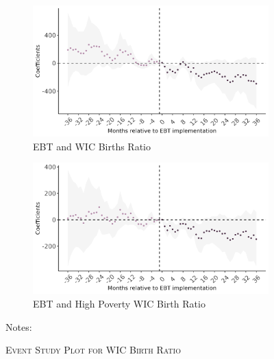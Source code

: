 \begin{figure}[!htbp]
	\begin{subfigure}[t]{.5\textwidth}
		\centering
		\includegraphics[width=\textwidth]{frac_mom_wic.png}  
		\caption{EBT and WIC Births Ratio}
		\label{mk_es1}
	\end{subfigure}
	\begin{subfigure}[t]{.5\textwidth}
		\centering
		\includegraphics[width=\textwidth]{frac_poor_wic.png}  
		\caption{EBT and High Poverty WIC Birth Ratio}
		\label{mk_es2}
	\end{subfigure}
	\caption{\textsc{Event Study Plot for WIC Birth Ratio}}
	\label{mk_es}
	\footnotesize
	\vspace{6pt}
	\vspace{4pt}
	Notes: 
\end{figure}


